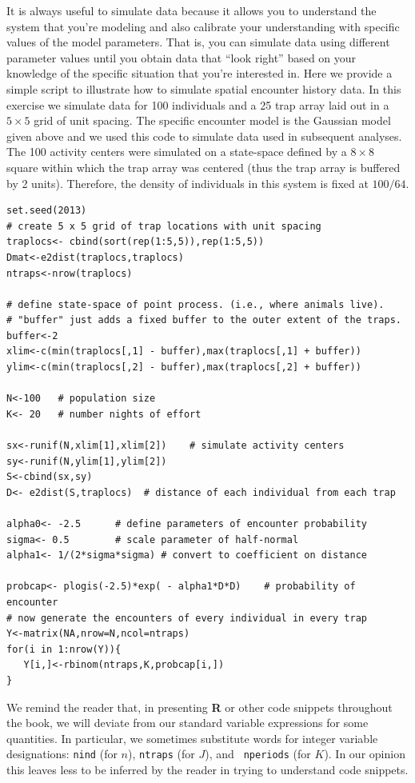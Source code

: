 It is always useful to simulate data because it allows you to
understand the system that you're modeling and also calibrate your
understanding with specific values of the model parameters.
That is, you can
simulate data using different parameter values until you obtain data
that ``look right'' based on your knowledge of the specific situation
that you're interested in. Here we provide a simple script to
illustrate how to simulate spatial encounter history data. In this
exercise we simulate data for 100 individuals and a 25 trap array laid
out in a $5 \times 5$ grid of unit spacing.  The specific encounter
model is the Gaussian model given above and we used this code to
simulate data used in subsequent analyses.  The 100 activity centers
were simulated on a state-space defined by a $8 \times 8$ square
within which the trap array was centered (thus the trap array is
buffered by 2 units). Therefore, the density of individuals in this
system is fixed at $100/64$.

{\small
\begin{verbatim}
set.seed(2013)
# create 5 x 5 grid of trap locations with unit spacing
traplocs<- cbind(sort(rep(1:5,5)),rep(1:5,5))
Dmat<-e2dist(traplocs,traplocs)
ntraps<-nrow(traplocs)

# define state-space of point process. (i.e., where animals live).
# "buffer" just adds a fixed buffer to the outer extent of the traps.
buffer<-2
xlim<-c(min(traplocs[,1] - buffer),max(traplocs[,1] + buffer))
ylim<-c(min(traplocs[,2] - buffer),max(traplocs[,2] + buffer))

N<-100   # population size
K<- 20   # number nights of effort

sx<-runif(N,xlim[1],xlim[2])    # simulate activity centers
sy<-runif(N,ylim[1],ylim[2])
S<-cbind(sx,sy)
D<- e2dist(S,traplocs)  # distance of each individual from each trap

alpha0<- -2.5      # define parameters of encounter probability
sigma<- 0.5        # scale parameter of half-normal
alpha1<- 1/(2*sigma*sigma) # convert to coefficient on distance

probcap<- plogis(-2.5)*exp( - alpha1*D*D)    # probability of encounter
# now generate the encounters of every individual in every trap
Y<-matrix(NA,nrow=N,ncol=ntraps)
for(i in 1:nrow(Y)){
   Y[i,]<-rbinom(ntraps,K,probcap[i,])
}
\end{verbatim}
}
We remind the reader that, in presenting {\bf R} or other code snippets
throughout the book, we will deviate from our standard variable
expressions for some quantities.
In particular, we sometimes
substitute words for integer variable designations:
\mbox{\tt nind} (for $n$), \mbox{\tt ntraps} (for $J$), and \mbox{\tt
 nperiods} (for $K$). In our opinion this leaves less to be inferred
by the reader in trying to understand code snippets.

